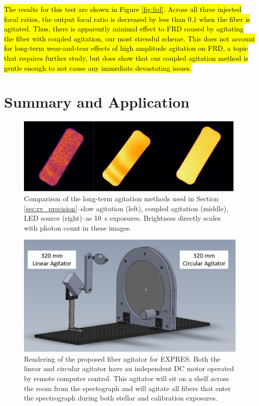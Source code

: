\documentclass[twocolumn]{emulateapj}
\begin{document}
\hl{The results for this test are shown in Figure {\ref{fig:frd}}. Across all three injected focal ratios, the output focal ratio is decreased by less than 0.1 when the fiber is agitated. Thus, there is apparently minimal effect to FRD caused by agitating the fiber with coupled agitation, our most stressful scheme. This does not account for long-term wear-and-tear effects of high amplitude agitation on FRD, a topic that requires further study, but does show that our coupled agitation method is gentle enough to not cause any immediate devastating issues.}

\section{Summary and Application}
\label{sec:conclusions}

\begin{figure}
\centering
	\includegraphics[width=\columnwidth]{images/fiber_rv_error.pdf}
	\caption{Comparison of the long-term agitation methods used in Section \ref{sec:rv_precision}--slow agitation (left), coupled agitation (middle), LED source (right)--as \SI{10}{\second} exposures. Brightness directly scales with photon count in these images.}
\label{fig:fiber_rv_error}
\end{figure}

\begin{figure}
\centering
	\includegraphics[width=\columnwidth]{images/agitator_model.pdf}
	\caption{Rendering of the proposed fiber agitator for EXPRES. Both the linear and circular agitator have an independent DC motor operated by remote computer control. This agitator will sit on a shelf across the room from the spectograph and will agitate all fibers that enter the spectrograph during both stellar and calibration exposures.}
\label{fig:agitator_model}
\end{figure}
\end{document}
